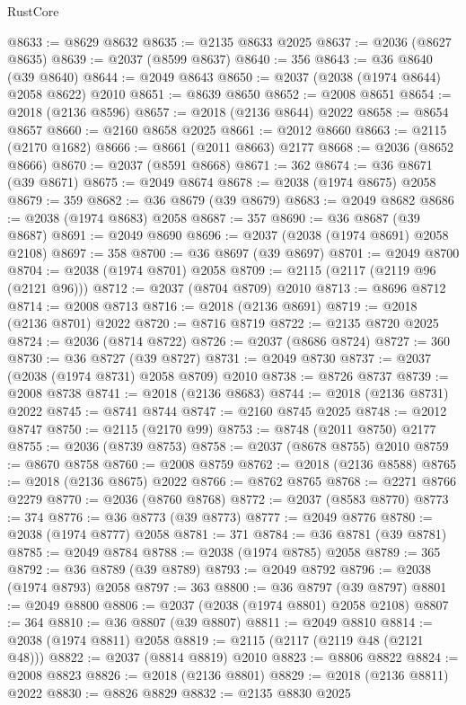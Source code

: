 \begin{lexlean}{RustCore}
\begin{coremodule}
@8633 := @8629 @8632
@8635 := @2135 @8633 @2025
@8637 := @2036 (@8627 @8635)
@8639 := @2037 (@8599 @8637)
@8640 := 356
@8643 := @36 @8640 (@39 @8640)
@8644 := @2049 @8643
@8650 := @2037 (@2038 (@1974 @8644) @2058 @8622) @2010
@8651 := @8639 @8650
@8652 := @2008 @8651
@8654 := @2018 (@2136 @8596)
@8657 := @2018 (@2136 @8644) @2022
@8658 := @8654 @8657
@8660 := @2160 @8658 @2025
@8661 := @2012 @8660
@8663 := @2115 (@2170 @1682)
@8666 := @8661 (@2011 @8663) @2177
@8668 := @2036 (@8652 @8666)
@8670 := @2037 (@8591 @8668)
@8671 := 362
@8674 := @36 @8671 (@39 @8671)
@8675 := @2049 @8674
@8678 := @2038 (@1974 @8675) @2058
@8679 := 359
@8682 := @36 @8679 (@39 @8679)
@8683 := @2049 @8682
@8686 := @2038 (@1974 @8683) @2058
@8687 := 357
@8690 := @36 @8687 (@39 @8687)
@8691 := @2049 @8690
@8696 := @2037 (@2038 (@1974 @8691) @2058 @2108)
@8697 := 358
@8700 := @36 @8697 (@39 @8697)
@8701 := @2049 @8700
@8704 := @2038 (@1974 @8701) @2058
@8709 := @2115 (@2117 (@2119 @96 (@2121 @96)))
@8712 := @2037 (@8704 @8709) @2010
@8713 := @8696 @8712
@8714 := @2008 @8713
@8716 := @2018 (@2136 @8691)
@8719 := @2018 (@2136 @8701) @2022
@8720 := @8716 @8719
@8722 := @2135 @8720 @2025
@8724 := @2036 (@8714 @8722)
@8726 := @2037 (@8686 @8724)
@8727 := 360
@8730 := @36 @8727 (@39 @8727)
@8731 := @2049 @8730
@8737 := @2037 (@2038 (@1974 @8731) @2058 @8709) @2010
@8738 := @8726 @8737
@8739 := @2008 @8738
@8741 := @2018 (@2136 @8683)
@8744 := @2018 (@2136 @8731) @2022
@8745 := @8741 @8744
@8747 := @2160 @8745 @2025
@8748 := @2012 @8747
@8750 := @2115 (@2170 @99)
@8753 := @8748 (@2011 @8750) @2177
@8755 := @2036 (@8739 @8753)
@8758 := @2037 (@8678 @8755) @2010
@8759 := @8670 @8758
@8760 := @2008 @8759
@8762 := @2018 (@2136 @8588)
@8765 := @2018 (@2136 @8675) @2022
@8766 := @8762 @8765
@8768 := @2271 @8766 @2279
@8770 := @2036 (@8760 @8768)
@8772 := @2037 (@8583 @8770)
@8773 := 374
@8776 := @36 @8773 (@39 @8773)
@8777 := @2049 @8776
@8780 := @2038 (@1974 @8777) @2058
@8781 := 371
@8784 := @36 @8781 (@39 @8781)
@8785 := @2049 @8784
@8788 := @2038 (@1974 @8785) @2058
@8789 := 365
@8792 := @36 @8789 (@39 @8789)
@8793 := @2049 @8792
@8796 := @2038 (@1974 @8793) @2058
@8797 := 363
@8800 := @36 @8797 (@39 @8797)
@8801 := @2049 @8800
@8806 := @2037 (@2038 (@1974 @8801) @2058 @2108)
@8807 := 364
@8810 := @36 @8807 (@39 @8807)
@8811 := @2049 @8810
@8814 := @2038 (@1974 @8811) @2058
@8819 := @2115 (@2117 (@2119 @48 (@2121 @48)))
@8822 := @2037 (@8814 @8819) @2010
@8823 := @8806 @8822
@8824 := @2008 @8823
@8826 := @2018 (@2136 @8801)
@8829 := @2018 (@2136 @8811) @2022
@8830 := @8826 @8829
@8832 := @2135 @8830 @2025

\end{coremodule}
\end{lexlean}
